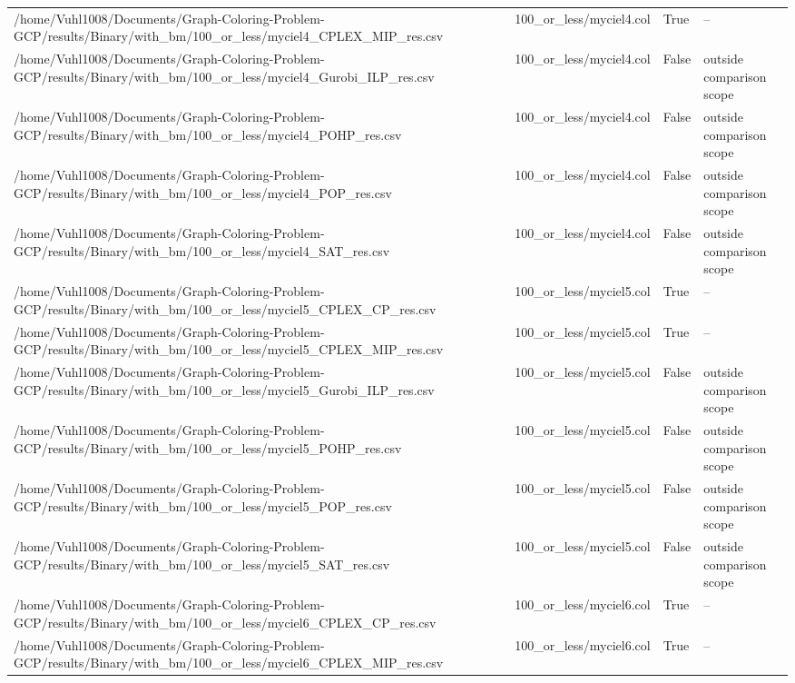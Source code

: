 \begin{table}[htbp]
\begin{tabular}{llll}
/home/Vuhl1008/Documents/Graph-Coloring-Problem-GCP/results/Binary/with\_bm/100\_or\_less/myciel4\_CPLEX\_MIP\_res.csv & 100\_or\_less/myciel4.col & True & -- \\
/home/Vuhl1008/Documents/Graph-Coloring-Problem-GCP/results/Binary/with\_bm/100\_or\_less/myciel4\_Gurobi\_ILP\_res.csv & 100\_or\_less/myciel4.col & False & outside comparison scope \\
/home/Vuhl1008/Documents/Graph-Coloring-Problem-GCP/results/Binary/with\_bm/100\_or\_less/myciel4\_POHP\_res.csv & 100\_or\_less/myciel4.col & False & outside comparison scope \\
/home/Vuhl1008/Documents/Graph-Coloring-Problem-GCP/results/Binary/with\_bm/100\_or\_less/myciel4\_POP\_res.csv & 100\_or\_less/myciel4.col & False & outside comparison scope \\
/home/Vuhl1008/Documents/Graph-Coloring-Problem-GCP/results/Binary/with\_bm/100\_or\_less/myciel4\_SAT\_res.csv & 100\_or\_less/myciel4.col & False & outside comparison scope \\
/home/Vuhl1008/Documents/Graph-Coloring-Problem-GCP/results/Binary/with\_bm/100\_or\_less/myciel5\_CPLEX\_CP\_res.csv & 100\_or\_less/myciel5.col & True & -- \\
/home/Vuhl1008/Documents/Graph-Coloring-Problem-GCP/results/Binary/with\_bm/100\_or\_less/myciel5\_CPLEX\_MIP\_res.csv & 100\_or\_less/myciel5.col & True & -- \\
/home/Vuhl1008/Documents/Graph-Coloring-Problem-GCP/results/Binary/with\_bm/100\_or\_less/myciel5\_Gurobi\_ILP\_res.csv & 100\_or\_less/myciel5.col & False & outside comparison scope \\
/home/Vuhl1008/Documents/Graph-Coloring-Problem-GCP/results/Binary/with\_bm/100\_or\_less/myciel5\_POHP\_res.csv & 100\_or\_less/myciel5.col & False & outside comparison scope \\
/home/Vuhl1008/Documents/Graph-Coloring-Problem-GCP/results/Binary/with\_bm/100\_or\_less/myciel5\_POP\_res.csv & 100\_or\_less/myciel5.col & False & outside comparison scope \\
/home/Vuhl1008/Documents/Graph-Coloring-Problem-GCP/results/Binary/with\_bm/100\_or\_less/myciel5\_SAT\_res.csv & 100\_or\_less/myciel5.col & False & outside comparison scope \\
/home/Vuhl1008/Documents/Graph-Coloring-Problem-GCP/results/Binary/with\_bm/100\_or\_less/myciel6\_CPLEX\_CP\_res.csv & 100\_or\_less/myciel6.col & True & -- \\
/home/Vuhl1008/Documents/Graph-Coloring-Problem-GCP/results/Binary/with\_bm/100\_or\_less/myciel6\_CPLEX\_MIP\_res.csv & 100\_or\_less/myciel6.col & True & -- \\

\end{tabular}
\end{table}
